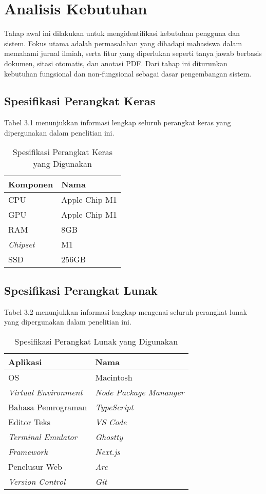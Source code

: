 \section{Analisis Kebutuhan}

Tahap awal ini dilakukan untuk mengidentifikasi kebutuhan pengguna dan sistem. Fokus utama adalah permasalahan yang dihadapi mahasiswa dalam memahami jurnal ilmiah, serta fitur yang diperlukan seperti tanya jawab berbasis dokumen, sitasi otomatis, dan anotasi PDF. Dari tahap ini diturunkan kebutuhan fungsional dan non-fungsional sebagai dasar pengembangan sistem.

\subsection{Spesifikasi Perangkat Keras}

Tabel 3.1 menunjukkan informasi lengkap seluruh perangkat keras yang
dipergunakan dalam penelitian ini.

\begin{table}[H]
  \caption{Spesifikasi Perangkat Keras yang Digunakan}

  \centering{}%
  \begin{tabular}{|l|l|}
    \hline
    \textbf{Komponen} & \textbf{Nama}\tabularnewline
    \hline
    \hline
    CPU               & Apple Chip M1\tabularnewline
    \hline
    GPU               & Apple Chip M1\tabularnewline
    \hline
    RAM               & 8GB\tabularnewline
    \hline
    \emph{Chipset}    & M1\tabularnewline
    \hline
    SSD               & 256GB\tabularnewline
    \hline
  \end{tabular}
\end{table}


\subsection{Spesifikasi Perangkat Lunak}

Tabel 3.2 menunjukkan informasi lengkap mengenai seluruh perangkat
lunak yang dipergunakan dalam penelitian ini.

\begin{table}[H]
  \caption{Spesifikasi Perangkat Lunak yang Digunakan}

  \centering{}%
  \begin{tabular}{|l|l|}
    \hline
    \textbf{Aplikasi}          & \textbf{Nama}\tabularnewline
    \hline
    \hline
    OS                         & Macintosh\tabularnewline
    \hline
    \emph{Virtual Environment} & \textit{Node Package Mananger}\tabularnewline
    \hline
    Bahasa Pemrograman         & \textit{TypeScript}\tabularnewline
    \hline
    Editor Teks                & \textit{VS Code}\tabularnewline
    \hline
    \emph{Terminal Emulator}   & \textit{Ghostty}\tabularnewline
    \hline
    \emph{Framework}           & \textit{Next.js}\tabularnewline
    \hline
    Penelusur Web              & \textit{Arc}\tabularnewline
    \hline
    \emph{Version Control}     & \textit{Git}\tabularnewline
    \hline
  \end{tabular}
\end{table}
